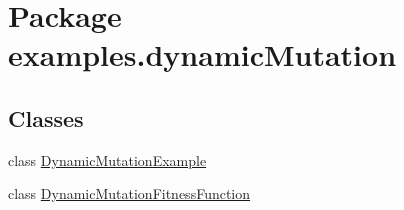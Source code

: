 \hypertarget{namespaceexamples_1_1dynamic_mutation}{\section{Package examples.\-dynamic\-Mutation}
\label{namespaceexamples_1_1dynamic_mutation}
}
\subsection*{Classes}
\begin{DoxyCompactItemize}
\item 
class \hyperlink{classexamples_1_1dynamic_mutation_1_1_dynamic_mutation_example}{Dynamic\-Mutation\-Example}
\item 
class \hyperlink{classexamples_1_1dynamic_mutation_1_1_dynamic_mutation_fitness_function}{Dynamic\-Mutation\-Fitness\-Function}
\end{DoxyCompactItemize}
